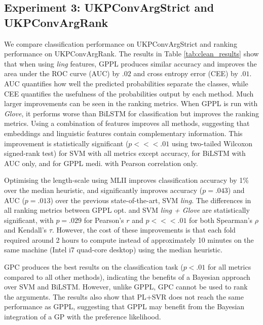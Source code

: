 \subsection{Experiment 3: UKPConvArgStrict and UKPConvArgRank}
% 
% 
%
We compare classification performance on UKPConvArgStrict  
and ranking performance on UKPConvArgRank. 
The results in Table \ref{tab:clean_results} show that when using \emph{ling} features,
GPPL produces similar accuracy and improves the area under the ROC curve (AUC) by $.02$ and cross entropy error (CEE) by $.01$.
AUC quantifies how well the predicted probabilities separate the classes,
while CEE quantifies the usefulness of the probabilities output by each method.
Much larger improvements can be seen in the ranking metrics. 
When GPPL is run with \emph{Glove}, it performs worse than
BiLSTM for classification but improves the ranking metrics. 
Using a combination of features improves all methods, suggesting that embeddings and linguistic features contain complementary information. This improvement is statistically significant ($p <\!\!<\!\!< .01$ using two-tailed Wilcoxon signed-rank test) for SVM with all metrics except accuracy, for BiLSTM with AUC only, and for GPPL medi. with Pearson correlation only.

Optimising the length-scale using MLII improves classification accuracy by 1\% over the median heuristic,
and significantly improves accuracy ($p=.043$) and AUC ($p=.013$) 
over the previous state-of-the-art, SVM \emph{ling}.
The differences in all ranking metrics between GPPL opt. and SVM \emph{ling + Glove} 
are statistically significant, with $p=.029$ for Pearson's $r$ and $p<\!<\!<.01$ for both 
Spearman's $\rho$ and Kendall's $\tau$.
However, the cost of these improvements is that each fold required around 2 hours to compute instead of 
approximately 10 minutes on the same machine (Intel i7 quad-core desktop) using the median heuristic. 

GPC produces the best results on the classification task ($p<.01$ for all metrics compared to all other methods), 
indicating the benefits of a Bayesian approach over SVM and BiLSTM.
However, unlike GPPL, GPC cannot be used to rank the arguments.
The results also show that PL+SVR does not reach the same performance as GPPL, 
suggesting that GPPL may benefit from the Bayesian integration of a GP with the preference likelihood. 

